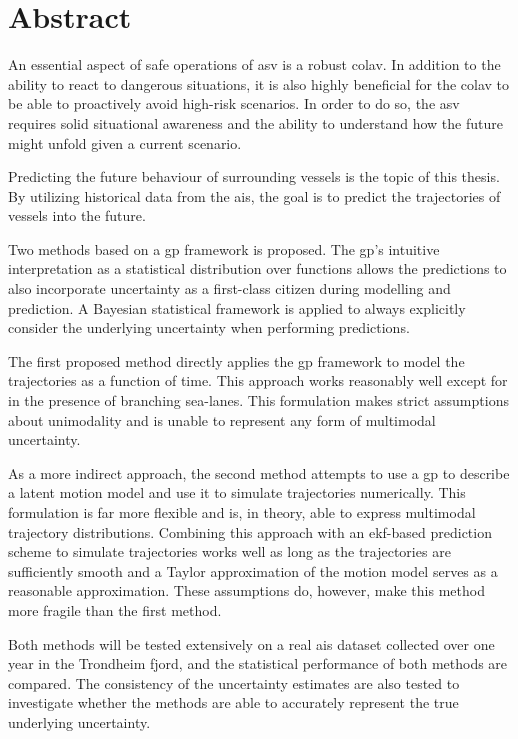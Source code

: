 \chapter*{Abstract}
An essential aspect of safe operations of \acrshort{asv} is a robust \acrfull{colav}. In addition to the ability to react to dangerous situations, it is also highly beneficial for the \acrshort{colav} to be able to proactively avoid high-risk scenarios. In order to do so, the \acrshort{asv} requires solid situational awareness and the ability to understand how the future might unfold given a current scenario. 

Predicting the future behaviour of surrounding vessels is the topic of this thesis. By utilizing historical data from the \acrfull{ais}, the goal is to predict the trajectories of vessels into the future. 

Two methods based on a \acrfull{gp} framework is proposed. The \acrshort{gp}'s intuitive interpretation as a statistical distribution over functions allows the predictions to also incorporate uncertainty as a first-class citizen during modelling and prediction. A Bayesian statistical framework is applied to always explicitly consider the underlying uncertainty when performing predictions. 

The first proposed method directly applies the \acrshort{gp} framework to model the trajectories as a function of time. This approach works reasonably well except for in the presence of branching sea-lanes. This formulation makes strict assumptions about unimodality and is unable to represent any form of multimodal uncertainty.

As a more indirect approach, the second method attempts to use a \acrshort{gp} to describe a latent motion model and use it to simulate trajectories numerically. This formulation is far more flexible and is, in theory, able to express multimodal trajectory distributions. Combining this approach with an \acrfull{ekf}-based prediction scheme to simulate trajectories works well as long as the trajectories are sufficiently smooth and a Taylor approximation of the motion model serves as a reasonable approximation. These assumptions do, however, make this method more fragile than the first method.

Both methods will be tested extensively on a real \acrshort{ais} dataset collected over one year in the Trondheim fjord, and the statistical performance of both methods are compared. The consistency of the uncertainty estimates are also tested to investigate whether the methods are able to accurately represent the true underlying uncertainty.